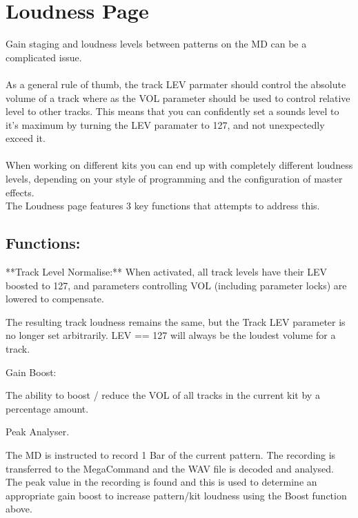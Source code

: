 \chapter{Loudness Page}
Gain staging and loudness levels between patterns on the MD can be a complicated issue.\\
\\
As a general rule of thumb, the track LEV parmater should control the absolute volume of a track where as the VOL parameter should be used to control relative level to other tracks. This means that you can confidently set a sounds level to it's maximum by turning the LEV paramater to 127, and not unexpectedly exceed it.\\
\\
When working on different kits you can end up with completely different loudness levels, depending on your style of programming and the configuration of master effects.\\

The Loudness page features 3 key functions that attempts to address this.

\section{Functions:}

**Track Level Normalise:** When activated,  all track levels have their LEV boosted to 127, and parameters controlling VOL (including parameter locks) are lowered to compensate. 

The resulting track loudness remains the same, but the Track LEV parameter is no longer set arbitrarily. LEV == 127 will always be the loudest volume for a track.

Gain Boost:

The ability to boost / reduce the VOL of all tracks in the current kit by a percentage amount.

Peak Analyser.

The MD is instructed to record 1 Bar of the current pattern. The recording is transferred to the MegaCommand and the WAV file is decoded and analysed. The peak value in the recording is found and this is used to determine an appropriate gain boost to increase pattern/kit loudness using the Boost function above.